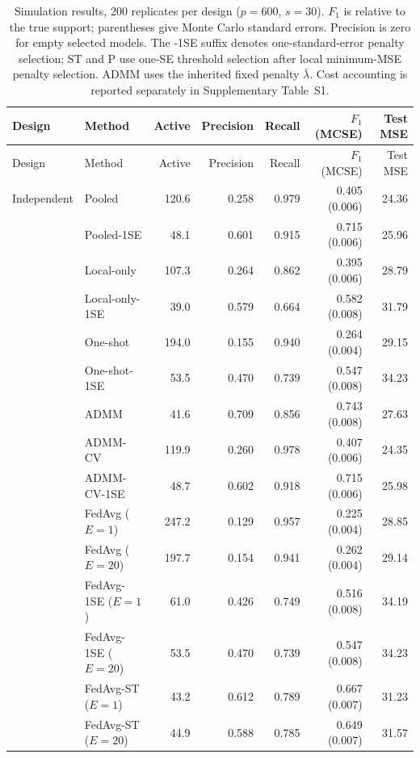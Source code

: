 \begingroup\footnotesize\setlength{\tabcolsep}{4pt}\renewcommand{\arraystretch}{0.93}
\begin{longtable}{llrrrrr}
\caption{Simulation results, 200 replicates per design ($p=600$, $s=30$). $F_1$ is relative to the true support; parentheses give Monte Carlo standard errors. Precision is zero for empty selected models. The -1SE suffix denotes one-standard-error penalty selection; ST and P use one-SE threshold selection after local minimum-MSE penalty selection. ADMM uses the inherited fixed penalty $\bar\lambda$. Cost accounting is reported separately in Supplementary Table~S1.}\label{tab:main}\\
\toprule
Design & Method & Active & Precision & Recall & $F_1$ (MCSE) & Test MSE \\
\midrule
\endfirsthead
\toprule
Design & Method & Active & Precision & Recall & $F_1$ (MCSE) & Test MSE \\
\midrule
\endhead
\bottomrule
\endfoot
Independent & Pooled & 120.6 & 0.258 & 0.979 & 0.405 (0.006) & 24.36 \\
 & Pooled-1SE & 48.1 & 0.601 & 0.915 & 0.715 (0.006) & 25.96 \\
 & Local-only & 107.3 & 0.264 & 0.862 & 0.395 (0.006) & 28.79 \\
 & Local-only-1SE & 39.0 & 0.579 & 0.664 & 0.582 (0.008) & 31.79 \\
 & One-shot & 194.0 & 0.155 & 0.940 & 0.264 (0.004) & 29.15 \\
 & One-shot-1SE & 53.5 & 0.470 & 0.739 & 0.547 (0.008) & 34.23 \\
 & ADMM & 41.6 & 0.709 & 0.856 & 0.743 (0.008) & 27.63 \\
 & ADMM-CV & 119.9 & 0.260 & 0.978 & 0.407 (0.006) & 24.35 \\
 & ADMM-CV-1SE & 48.7 & 0.602 & 0.918 & 0.715 (0.006) & 25.98 \\
 & FedAvg ($E=1$) & 247.2 & 0.129 & 0.957 & 0.225 (0.004) & 28.85 \\
 & FedAvg ($E=20$) & 197.7 & 0.154 & 0.941 & 0.262 (0.004) & 29.14 \\
 & FedAvg-1SE ($E=1$) & 61.0 & 0.426 & 0.749 & 0.516 (0.008) & 34.19 \\
 & FedAvg-1SE ($E=20$) & 53.5 & 0.470 & 0.739 & 0.547 (0.008) & 34.23 \\
 & FedAvg-ST ($E=1$) & 43.2 & 0.612 & 0.789 & 0.667 (0.007) & 31.23 \\
 & FedAvg-ST ($E=20$) & 44.9 & 0.588 & 0.785 & 0.649 (0.007) & 31.57 \\

\end{longtable}
